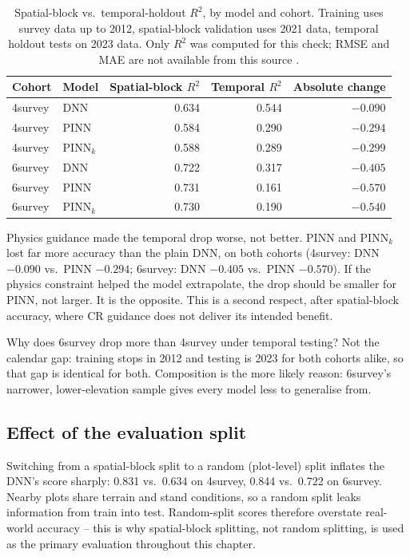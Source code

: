 \begin{table}[!htbp]
\centering
\small
\renewcommand{\arraystretch}{1.2}
\setlength{\tabcolsep}{4pt}
\begin{tabular}{llrrr}
\toprule
Cohort & Model & Spatial-block $R^2$ & Temporal $R^2$ & Absolute change \\
\midrule
4survey & DNN & 0.634 & 0.544 & $-0.090$ \\
4survey & PINN & 0.584 & 0.290 & $-0.294$ \\
4survey & PINN$_k$ & 0.588 & 0.289 & $-0.299$ \\
6survey & DNN & 0.722 & 0.317 & $-0.405$ \\
6survey & PINN & 0.731 & 0.161 & $-0.570$ \\
6survey & PINN$_k$ & 0.730 & 0.190 & $-0.540$ \\
\bottomrule
\end{tabular}
\caption{Spatial-block vs.\ temporal-holdout $R^2$, by model and cohort. Training uses survey data
up to 2012, spatial-block validation uses 2021 data, temporal holdout tests on 2023 data. Only
$R^2$ was computed for this check; RMSE and MAE are not available from this source
.}
\label{tab:results-rq1-temporal}
\end{table}

Physics guidance made the temporal drop worse, not better. PINN and PINN$_k$ lost far more
accuracy than the plain DNN, on both cohorts (4survey: DNN $-0.090$ vs.\ PINN $-0.294$; 6survey:
DNN $-0.405$ vs.\ PINN $-0.570$). If the physics constraint helped the model extrapolate, the drop
should be smaller for PINN, not larger. It is the opposite. This is a second respect, after
spatial-block accuracy, where CR guidance does not deliver its intended benefit.

Why does 6survey drop more than 4survey under temporal testing? Not the calendar gap: training
stops in 2012 and testing is 2023 for both cohorts alike, so that gap is identical for both.
Composition is the more likely reason: 6survey's narrower, lower-elevation sample gives every
model less to generalise from.


\subsection{Effect of the evaluation split}

Switching from a spatial-block split to a random (plot-level) split inflates the DNN's score
sharply: 0.831 vs.\ 0.634 on 4survey, 0.844 vs.\ 0.722 on 6survey. Nearby plots share terrain and
stand conditions, so a random split leaks information from train into test. Random-split scores
therefore overstate real-world accuracy -- this is why spatial-block splitting, not random
splitting, is used as the primary evaluation throughout this chapter.

